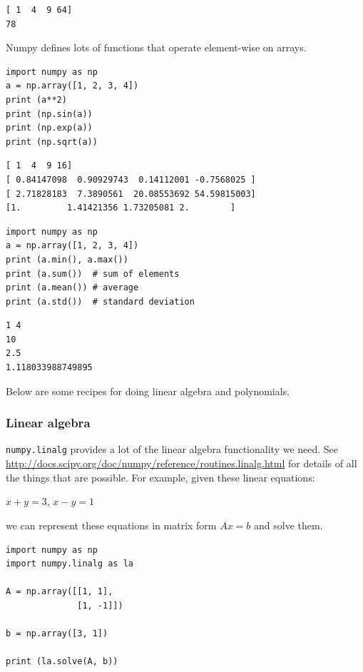 \documentclass[11pt]{article}
\begin{document}
\begin{verbatim}
[ 1  4  9 64]
78
\end{verbatim}

Numpy defines lots of functions that operate element-wise on arrays.

\begin{verbatim}
import numpy as np
a = np.array([1, 2, 3, 4])
print (a**2)
print (np.sin(a))
print (np.exp(a))
print (np.sqrt(a))
\end{verbatim}

\begin{verbatim}
[ 1  4  9 16]
[ 0.84147098  0.90929743  0.14112001 -0.7568025 ]
[ 2.71828183  7.3890561  20.08553692 54.59815003]
[1.         1.41421356 1.73205081 2.        ]
\end{verbatim}

\begin{verbatim}
import numpy as np
a = np.array([1, 2, 3, 4])
print (a.min(), a.max())
print (a.sum())  # sum of elements
print (a.mean()) # average
print (a.std())  # standard deviation
\end{verbatim}

\begin{verbatim}
1 4
10
2.5
1.118033988749895
\end{verbatim}


Below are some recipes for doing linear algebra and polynomials.


\subsubsection{Linear algebra}
\label{sec:orgb3fb2b7}
\texttt{numpy.linalg} provides a lot of the linear algebra functionality we need. See \url{http://docs.scipy.org/doc/numpy/reference/routines.linalg.html} for details of all the things that are possible. For example, given these linear equations:

\(x + y = 3\), 
\(x - y = 1\)

we can represent these equations in matrix form \(A x = b\) and solve them.

\begin{verbatim}
import numpy as np
import numpy.linalg as la

A = np.array([[1, 1],
              [1, -1]])

b = np.array([3, 1])

print (la.solve(A, b))
\end{verbatim}
\end{document}
